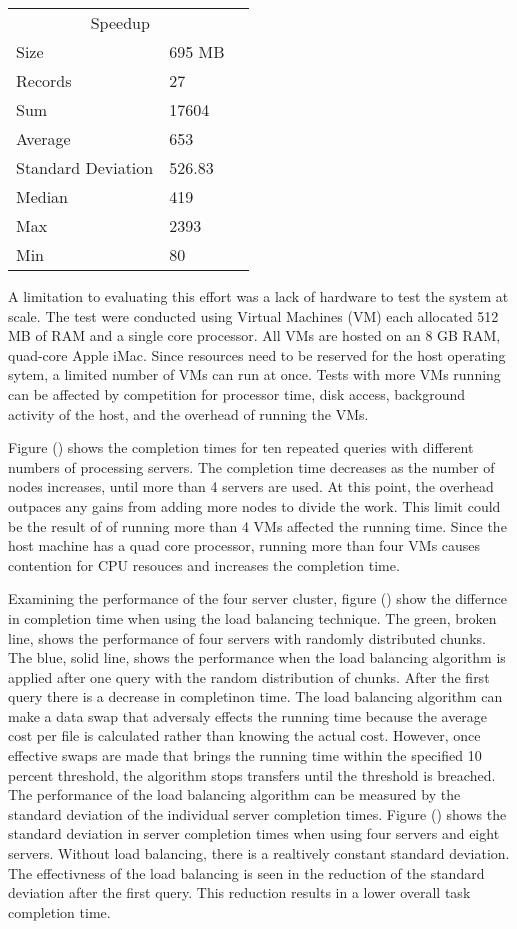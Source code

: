 \documentclass{article}
\begin{document}
\begin{multicols}{2}
\begin{tabular}{llr}
\hline
\multicolumn{2}{c}{Speedup} \\
\cline{1-2}
Size & 695 MB \\
Records & 27 \\
Sum & 17604 \\
Average & 653 \\ 
Standard Deviation & 526.83 \\
Median & 419 \\
Max & 2393 \\
Min & 80 \\
\hline
\end{tabular}




A limitation to evaluating this effort was a lack of hardware to test the system at scale. The test were conducted using Virtual Machines (VM) each allocated 512 MB of RAM and a single core processor.  All VMs are hosted on an 8 GB RAM, quad-core Apple iMac. Since resources need to be reserved for the host operating sytem, a limited number of VMs can run at once.  Tests with more VMs running can be affected by competition for processor time, disk access, background activity of the host, and the overhead of running the VMs.

Figure () shows the completion times for ten repeated queries with different numbers of processing servers.  The completion time decreases as the number of nodes increases, until more than 4 servers are used.  At this point, the overhead outpaces any gains from adding more nodes to divide the work.  This limit could be the result of of running more than 4 VMs affected the running time.  Since the host machine has a quad core processor, running more than four VMs causes contention for CPU resouces and increases the completion time.

Examining the performance of the four server cluster, figure () show the differnce in completion time when using the load balancing technique.  The green, broken line, shows the performance of four servers with randomly distributed chunks. The blue, solid line, shows the performance when the load balancing algorithm is applied after one query with the random distribution of chunks.  After the first query there is a decrease in completinon time.  The load balancing algorithm can make a data swap that adversaly effects the running time because the average cost per file is calculated rather than knowing the actual cost. However, once effective swaps are made that brings the running time within the specified 10 percent threshold, the algorithm stops transfers until the threshold is breached.  The performance of the load balancing algorithm can be measured by the standard deviation of the individual server completion times. Figure () shows the standard deviation in server completion times when using four servers and eight servers.  Without load balancing, there is a realtively constant standard deviation.  The effectivness of the load balancing is seen in the reduction of the standard deviation after the first query.  This reduction results in a lower overall task completion time.  



\end{multicols}
\end{document}
